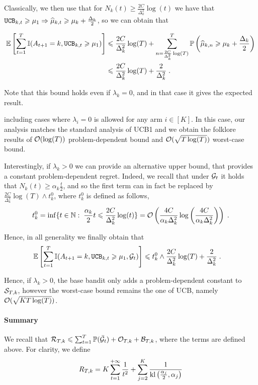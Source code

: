 Classically, we then use that for $N_k(t)\geq \frac{2C}{\Delta_k^2} \log(t)$ we have that $\texttt{UCB}_{k, t}\geqslant \mu_1 \Rightarrow \widehat{\mu}_{k, t} \geqslant \mu_k + \frac{\Delta_k}{2}$, so we can obtain that 

\begin{align*}
\mathbb{E}\left[\sum_{t=1}^T \mathbb{I}(A_{t+1}=k, \texttt{UCB}_{k, t}\geqslant \mu_1)\right] &\leqslant \frac{2C}{\Delta_k^2} \log(T) + \sum_{n=\frac{2C}{\Delta_k^2} \log(T)}^T \mathbb{P}\left(\widehat{\mu}_{k, n}\geqslant \mu_k + \frac{\Delta_k}{2}\right) \\
& \leqslant \frac{2C}{\Delta_k^2} \log(T) + \frac{2}{\Delta_k^2} \;.
\end{align*}

Note that this bound holds even if $\lambda_k=0$, and in that case it gives the expected result. 

including cases where $\lambda_i = 0$ is allowed for any arm $i \in [K]$. In this case, our analysis matches the standard analysis of UCB1 and we obtain the folklore results of $\mathcal{O}(\log(T))$ problem-dependent bound and $\mathcal{O}(\sqrt{T\log(T)})$ worst-case bound.

Interestingly, if $\lambda_k>0$ we can provide an alternative upper bound, that provides a constant problem-dependent regret. Indeed, we recall that under $\mathcal{G}_t$ it holds that $N_k(t)\geq \alpha_k \frac{t}{2}$, and so the first term can in fact be replaced by $\frac{2C}{\Delta_k^2}\log(T)\wedge t_k^0$, where $t_k^0$ is defined as follows,
\[t_k^0 = \inf\{t\in \mathbb{N}: \; \frac{\alpha_k}{2}t\leqslant \frac{2C}{\Delta_k^2} \log(t) \}= \mathcal{O}\left(\frac{4C}{\alpha_k \Delta_k^2}\log\left(\frac{4C}{\alpha_k\Delta_k^2}\right)\right)\;.\]

Hence, in all generality we finally obtain that 
\begin{align*}
\mathbb{E}\left[\sum_{t=1}^T \mathbb{I}(A_{t+1}=k, \texttt{UCB}_{k, t}\geqslant \mu_1, \mathcal{G}_t)\right] &\leqslant t_k^0 \wedge  \frac{2C}{\Delta_k^2}\log(T) + \frac{2}{\Delta_k^2} \;.
\end{align*}

Hence, if $\lambda_k>0$, the base bandit only adds a problem-dependent constant to $\mathcal{S}_{T,k}$, however the worst-case bound remains the one of UCB, namely $\mathcal{O}(\sqrt{KT\log(T)})$.

\paragraph{Summary} We recall that $\mathcal{R}_{T,k}\leqslant \sum_{t=1}^T \mathbb{P}(\bar {\mathcal{G}}_t)+\mathcal{O}_{T, k}+ \mathcal{B}_{T,k}$, where the terms are defined above. For clarity, we define 
\[R_{T,k} =  K \sum_{t=1}^{+\infty} \frac{1}{t^2} + \sum_{j=2}^K\frac{1}{\text{\normalfont kl}\left(\frac{\alpha_j}{2}, \alpha_j\right)} \]

